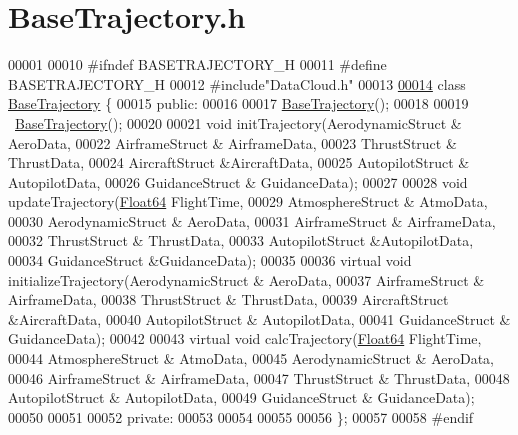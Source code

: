 \hypertarget{_base_trajectory_8h_source}{}\section{Base\+Trajectory.\+h}
\label{_base_trajectory_8h_source}

\begin{DoxyCode}
00001 
00010 \textcolor{preprocessor}{#ifndef BASETRAJECTORY\_H}
00011 \textcolor{preprocessor}{#define BASETRAJECTORY\_H}
00012 \textcolor{preprocessor}{#include"DataCloud.h"}
00013 
\hyperlink{group___trajectory}{00014} \textcolor{keyword}{class }\hyperlink{group___trajectory_class_base_trajectory}{BaseTrajectory} \{
00015 \textcolor{keyword}{public}:
00016 
00017     \hyperlink{group___trajectory_class_base_trajectory}{BaseTrajectory}();
00018 
00019     ~\hyperlink{group___trajectory_class_base_trajectory}{BaseTrajectory}();
00020 
00021     \textcolor{keywordtype}{void} initTrajectory(AerodynamicStruct & AeroData,
00022                         AirframeStruct & AirframeData,
00023                         ThrustStruct & ThrustData,
00024                         AircraftStruct &AircraftData, 
00025                         AutopilotStruct & AutopilotData,
00026                         GuidanceStruct & GuidanceData);
00027 
00028     \textcolor{keywordtype}{void} updateTrajectory(\hyperlink{group___tools_ga3f1431cb9f76da10f59246d1d743dc2c}{Float64} FlightTime,
00029                             AtmosphereStruct & AtmoData,
00030                             AerodynamicStruct & AeroData,
00031                             AirframeStruct & AirframeData,
00032                             ThrustStruct & ThrustData,
00033                             AutopilotStruct &AutopilotData,
00034                             GuidanceStruct &GuidanceData);
00035 
00036     \textcolor{keyword}{virtual} \textcolor{keywordtype}{void} initializeTrajectory(AerodynamicStruct & AeroData,
00037                                         AirframeStruct & AirframeData,
00038                                         ThrustStruct & ThrustData,
00039                                         AircraftStruct &AircraftData, 
00040                                      AutopilotStruct & AutopilotData,
00041                                      GuidanceStruct & GuidanceData);
00042 
00043     \textcolor{keyword}{virtual} \textcolor{keywordtype}{void} calcTrajectory(\hyperlink{group___tools_ga3f1431cb9f76da10f59246d1d743dc2c}{Float64} FlightTime,
00044                                 AtmosphereStruct & AtmoData,
00045                                 AerodynamicStruct & AeroData,
00046                                 AirframeStruct & AirframeData,
00047                                 ThrustStruct & ThrustData,
00048                                 AutopilotStruct & AutopilotData,
00049                                 GuidanceStruct & GuidanceData);
00050 
00051 
00052 \textcolor{keyword}{private}:
00053     
00054 
00055 
00056 \};
00057 
00058 \textcolor{preprocessor}{#endif}
\end{DoxyCode}
